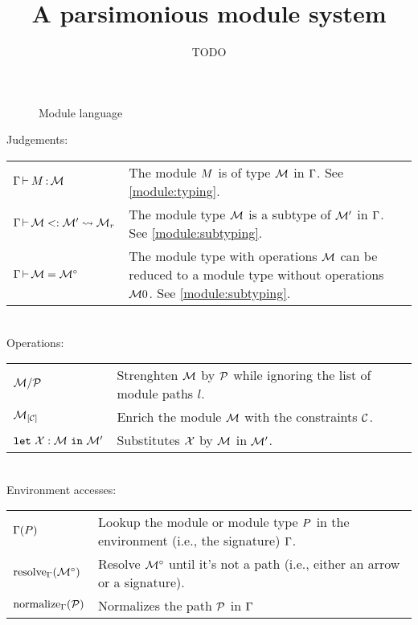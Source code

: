 \documentclass{article}
\title{A parsimonious module system}
\author{TODO}
\date{}
\theoremstyle{definition}
\begin{document}
\maketitle

\begin{figure}[!hb]
  
  \caption{Module language}
  \label{grammar}
\end{figure}

Judgements:\\
\begin{tabular}{ll}
  $\wtm{\E}{\im}{\iM}$
  & The module $\im$ is of type $\iM$ in $\E$.
  See \cref{module:typing}.\\

  $\submod{\E}{\iM}{\iM'}{\iM_r}$
  & The module type $\iM$ is a subtype of $\iM'$ in $\E$.
    See \cref{module:subtyping}.\\

  $\opeq{\E}{\iM}{\iMO}$
  & The module type with operations $\iM$ can be reduced to a module
    type without operations $\iM0$.
    See \cref{module:subtyping}.\\

\end{tabular}\\

Operations:\\
\begin{tabular}{ll}
  $\Sstrengthen{l}{\iP}{\iM}$
  & Strenghten $\iM$ by $\iP$ while ignoring the list of module paths $l$.\\
  $\Senrich{\iC}{\iM}$
  & Enrich the module $\iM$ with the constraints $\iC$.\\
  $\Ssubst{\iX : \iM}{\iM'}$
  & Substitutes $\iX$ by $\iM$ in $\iM'$.
\end{tabular}\\

Environment accesses:\\
\begin{tabular}{ll}
  $\lookup{\E}{\ip}$
  & Lookup the module or module type $\ip$ in the environment (i.e., the signature)
    $\E$.\\
  $\resolve{\E}{\iMO}$
  & Resolve $\iMO$ until it's not a path (i.e., either an arrow or a signature).\\
  $\Onormalize{\E}{\iP}$
  & Normalizes the path $\iP$ in $\E$
\end{tabular}
\end{document}
